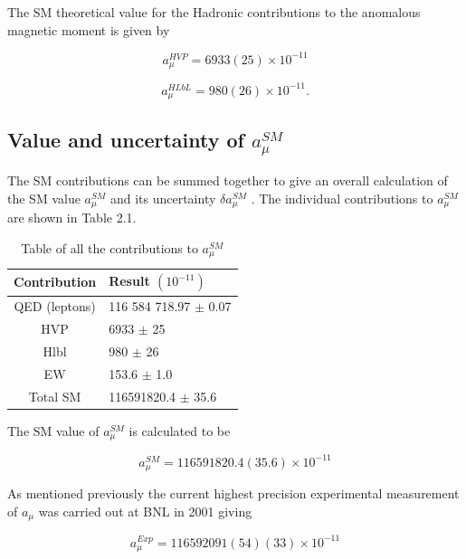 The SM theoretical value for the Hadronic contributions to the anomalous magnetic moment is given by

\begin{equation}
a_{\mu}^{HVP} = 6933(25){\times}10^{-11}
\end{equation}

\begin{equation}
a_{\mu}^{HLbL} = 980(26){\times}10^{-11}.
\end{equation}

\subsection{Value and uncertainty of $a_{\mu}^{SM}$}

The SM contributions can be summed together to give an overall calculation of the SM value $a_{\mu}^{SM}$ and its uncertainty ${\delta}a_{\mu}^{SM}$ \cite{Reference26}\cite{Reference27}. The individual contributions to $a_{\mu}^{SM}$ are shown in Table 2.1.

\begin{table}[h!]
\begin{center}
 \begin{tabular}{||c | m{5cm}||} 
 \hline
 Contribution & Result $(10^{-11})$ \\ [0.5ex] 
 \hline\hline
 QED (leptons) & 116 584 718.97 $\pm$ 0.07 \\ 
 \hline
 HVP & 6933 $\pm$ 25 \\
 \hline
 Hlbl & 980 $\pm$ 26 \\
 \hline
 EW & 153.6 $\pm$ 1.0 \\
 \hline
 Total SM & 116591820.4 $\pm$ 35.6 \\ [1ex] 
 \hline
\end{tabular}
\caption{Table of all the contributions to $a_{\mu}^{SM}$}
\label{table:1}
\end{center}
\end{table}
\noindent

The SM value of $a_{\mu}^{SM}$ is calculated to be

\begin{equation}
a_{\mu}^{SM} = 116591820.4(35.6){\times}10^{-11}
\end{equation}

As mentioned previously the current highest precision experimental measurement of $a_{\mu}$ was carried out at BNL in 2001 \cite{Reference27}\cite{Reference28} giving

\begin{equation}
a_{\mu}^{Exp} = 116592091(54)(33){\times}10^{-11}
\end{equation}

